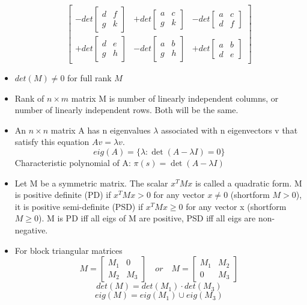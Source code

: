 \begin{itemize}
\[\begin{bmatrix}
                  -det\begin{bmatrix}d & f \\ g & k\end{bmatrix} & +det\begin{bmatrix}a & c \\ g & k\end{bmatrix} & -det\begin{bmatrix}a & c \\ d & f\end{bmatrix} \\
                  +det\begin{bmatrix}d & e \\ g & h\end{bmatrix} & -det\begin{bmatrix}a & b \\ g & h\end{bmatrix} & +det\begin{bmatrix}a & b \\ d & e\end{bmatrix}
              \end{bmatrix}\]
    \item \(det(M)\neq0\) for full rank \(M\)
    \item Rank of \(n\times m\) matrix M is number of linearly independent columns, or number of linearly independent rows. Both will be the same.
    \item An \(n \times n\) matrix A has n eigenvalues \(\lambda\) associated with n eigenvectors v that satisfy this equation \(Av=\lambda v\).
          \[eig(A)=\{\lambda : \det(A-\lambda I)=0\}\]
          Characteristic polynomial of A: \(\pi(s)=\det(A-\lambda I)\)
    \item Let M be a symmetric matrix. The scalar \(x^TMx\) is called a quadratic form. M is positive definite (PD) if \(x^TMx>0\) for any vector \(x\neq 0\) (shortform \(M>0\)), it is positive semi-definite (PSD) if \(x^TMx\geq 0\) for any vector x (shortform \(M\geq 0\)). M is PD iff all eigs of M are positive, PSD iff all eigs are non-negative.
    \item For block triangular matrices
          \[
              M = \begin{bmatrix}
                  M_1 & 0 \\ M_2 & M_3
              \end{bmatrix}
              \quad or \quad
              M=\begin{bmatrix}
                  M_1 & M_2 \\ 0 & M_3
              \end{bmatrix}
          \]
          \[det(M)=det(M_1)\cdot det(M_3)\]
          \[eig(M)=eig(M_1)\cup eig(M_3)\]
\end{itemize}